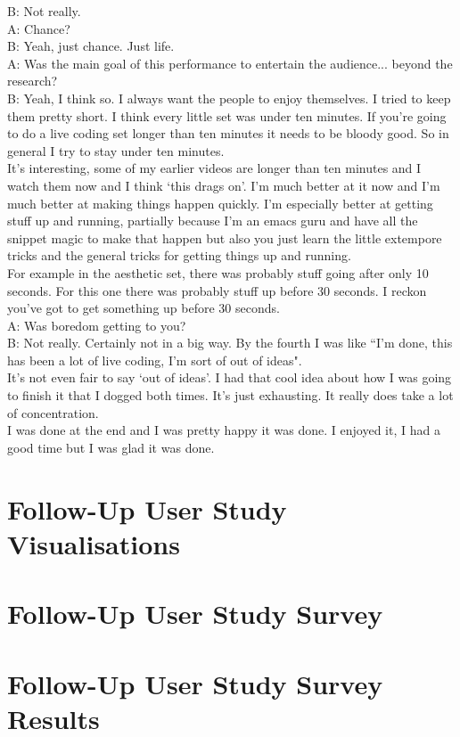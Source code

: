 B: Not really.\\

A: Chance?\\

B: Yeah, just chance. Just life.\\

A: Was the main goal of this performance to entertain the audience... beyond the research?\\

B: Yeah, I think so. I always want the people to enjoy themselves. I tried to keep them pretty short. I think every little set was under ten minutes. If you're going to do a live coding set longer than ten minutes it needs to be bloody good. So in general I try to stay under ten minutes.\\

It's interesting, some of my earlier videos are longer than ten minutes and I watch them now and I think `this drags on'. I'm much better at it now and I'm much better at making things happen quickly. I'm especially better at getting stuff up and running, partially because I'm an emacs guru and have all the snippet magic to make that happen but also you just learn the little extempore tricks and the general tricks for getting things up and running.\\

For example in the aesthetic set, there was probably stuff going after only 10 seconds. For this one there was probably stuff up before 30 seconds. I reckon you've got to get something up before 30 seconds.\\

A: Was boredom getting to you?\\

B: Not really. Certainly not in a big way. By the fourth I was like ``I'm done, this has been a lot of live coding, I'm sort of out of ideas".\\

It's not even fair to say `out of ideas'. I had that cool idea about how I was going to finish it that I dogged both times. It's just exhausting. It really does take a lot of concentration.\\

I was done at the end and I was pretty happy it was done. I enjoyed it, I had a good time but I was glad it was done.\\

\chapter{Follow-Up User Study Visualisations}

\chapter{Follow-Up User Study Survey}

\chapter{Follow-Up User Study Survey Results}


